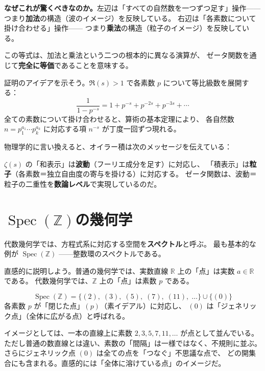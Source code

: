 \documentclass[11pt,a4paper]{article}
\theoremstyle{definition}
\newcommand{\Z}{\mathbb{Z}}
\newcommand{\R}{\mathbb{R}}
\newcommand{\Spec}{\operatorname{Spec}}
\begin{document}
\noindent\textbf{なぜこれが驚くべきなのか。}左辺は「すべての自然数を一つずつ足す」操作——
つまり\textbf{加法}の構造（波のイメージ）を反映している。
右辺は「各素数について掛け合わせる」操作——
つまり\textbf{乗法}の構造（粒子のイメージ）を反映している。

この等式は、加法と乗法という二つの根本的に異なる演算が、
ゼータ関数を通じて\textbf{完全に等価}であることを意味する。

\begin{hsbox}
証明のアイデアを示そう。$\Re(s)>1$ で各素数 $p$ について等比級数を展開する：
\[
  \frac{1}{1-p^{-s}} = 1 + p^{-s} + p^{-2s} + p^{-3s} + \cdots
\]
全ての素数について掛け合わせると、算術の基本定理により、
各自然数 $n = p_1^{a_1}\cdots p_k^{a_k}$ に対応する項 $n^{-s}$ が丁度一回ずつ現れる。
\end{hsbox}

物理学的に言い換えると、オイラー積は次のメッセージを伝えている：

\begin{hypbox}[物理的直観]
$\zeta(s)$ の「和表示」は\textbf{波動}（フーリエ成分を足す）に対応し、
「積表示」は\textbf{粒子}（各素数＝独立自由度の寄与を掛ける）に対応する。
ゼータ関数は、波動＝粒子の二重性を\textbf{数論レベル}で実現しているのだ。
\end{hypbox}

\section{$\Spec(\Z)$の幾何学}
\label{sec:1.3}

代数幾何学では、方程式系に対応する空間を\textbf{スペクトル}と呼ぶ。
最も基本的な例が $\Spec(\Z)$ ——整数環のスペクトルである。

直感的に説明しよう。普通の幾何学では、実数直線 $\R$ 上の「点」は実数 $a\in\R$ である。
代数幾何学では、$\Z$ 上の「点」は素数 $p$ である。

\begin{dfnbox}[定義: $\Spec(\Z)$]
\[
  \Spec(\Z) = \{(2),\; (3),\; (5),\; (7),\; (11),\; \ldots\} \cup \{(0)\}
\]
各素数 $p$ が「閉じた点」$(p)$（素イデアル）に対応し、
$(0)$ は「ジェネリック点」（全体に広がる点）と呼ばれる。
\end{dfnbox}

\begin{hsbox}
イメージとしては、一本の直線上に素数 $2, 3, 5, 7, 11, \ldots$ が点として並んでいる。
ただし普通の数直線とは違い、素数の「間隔」は一様ではなく、不規則に並ぶ。
さらにジェネリック点 $(0)$ は全ての点を「つなぐ」不思議な点で、
どの開集合にも含まれる。直感的には「全体に溶けている点」のイメージだ。
\end{hsbox}
\end{document}
